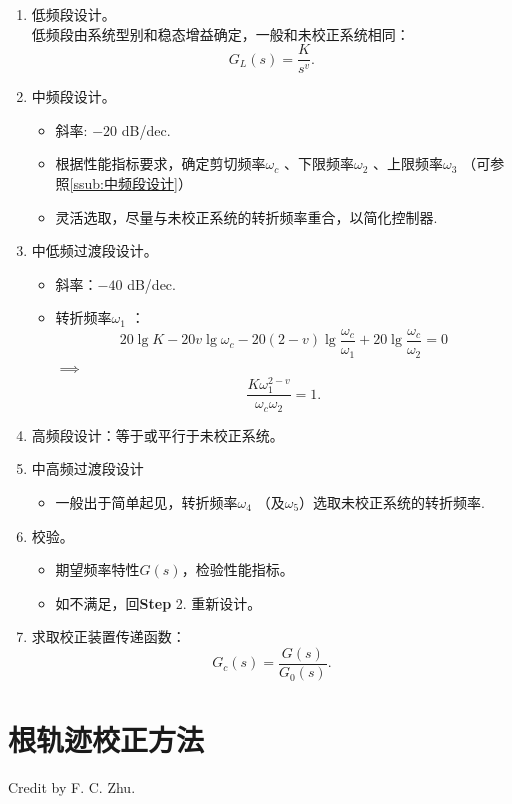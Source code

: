 \documentclass[14pt,a4paper]{article}
\theoremstyle{plain}
\theoremstyle{definition}
\theoremstyle{remark}
\theoremstyle{plain}
\theoremstyle{plain}
\theoremstyle{plain}
\theoremstyle{definition}
\theoremstyle{remark}
\numberwithin{equation}{section}
\begin{document}
				\begin{enumerate} 
					\item 低频段设计。\\
						低频段由系统型别和稳态增益确定，一般和未校正系统相同：
						\[
							G_L(s) = \dfrac{K}{s^{v}}
						.\] 
					\item 中频段设计。 
						\begin{itemize}
							\item 斜率: $-20$ dB/dec. 
							\item 根据性能指标要求，确定剪切频率$\omega_c$ 、下限频率$\omega_2$ 、上限频率$\omega_3$ （可参照\ref{ssub:中频段设计}）
							\item 灵活选取，尽量与未校正系统的转折频率重合，以简化控制器. 
						\end{itemize}  
					\item 中低频过渡段设计。
						\begin{itemize}
							\item 斜率：$-40$ dB/dec. 
							\item 转折频率$\omega_1$ ：
								\[
									20\lg K - 20 v \lg \omega_c - 20(2-v)\lg \dfrac{\omega_c}{\omega_1} + 20 \lg \dfrac{\omega_c}{\omega_2 } = 0 
								\]
								$\implies $
								\[
								\dfrac{K \omega_1^{2-v} }{\omega_c \omega_{2}} = 1
								.\] 
						\end{itemize} 
					\item 高频段设计：等于或平行于未校正系统。
					\item 中高频过渡段设计
						\begin{itemize}
							\item 一般出于简单起见，转折频率$\omega_4$ （及$\omega_5$）选取未校正系统的转折频率. 
						\end{itemize} 
					\item 校验。
						\begin{itemize}
							\item 期望频率特性$G(s)$，检验性能指标。
							\item 如不满足，回\textbf{Step} 2. 重新设计。
						\end{itemize} 
					\item 求取校正装置传递函数：
						\[
							G_c(s) = \dfrac{G(s)}{G_0(s)}
						.\] 
				\end{enumerate} 

	\newpage 
	
	\section{根轨迹校正方法}%
	\label{sec:根轨迹校正方法}
        Credit by F. C. Zhu. 
\end{document}
